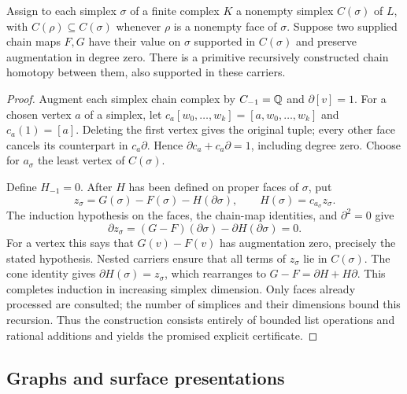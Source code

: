 \begin{theorem}
\label{thm:simplex-carrier}
Assign to each simplex $\sigma$ of a finite complex $K$ a nonempty
simplex $C(\sigma)$ of $L$, with
$C(\rho)\subseteq C(\sigma)$ whenever $\rho$ is a nonempty face of
$\sigma$.  Suppose two supplied chain maps $F,G$ have their value on
$\sigma$ supported in $C(\sigma)$ and preserve augmentation in degree
zero.  There is a primitive recursively constructed chain homotopy
between them, also supported in these carriers.
\end{theorem}
\begin{proof}
Augment each simplex chain complex by $C_{-1}=\mathbb Q$ and
$\partial[v]=1$.  For a chosen vertex $a$ of a simplex, let
$c_a[w_0,\ldots,w_k]=[a,w_0,\ldots,w_k]$ and $c_a(1)=[a]$.
Deleting the first vertex gives the original tuple; every other face
cancels its counterpart in $c_a\partial$.  Hence
$\partial c_a+c_a\partial=1$, including degree zero.  Choose for
$a_\sigma$ the least vertex of $C(\sigma)$.

Define $H_{-1}=0$.  After $H$ has been defined on proper faces of
$\sigma$, put
\[
 z_\sigma=G(\sigma)-F(\sigma)-H(\partial\sigma),\qquad
 H(\sigma)=c_{a_\sigma}z_\sigma.
\]
The induction hypothesis on the faces, the chain-map identities, and
$\partial^2=0$ give
\[
 \partial z_\sigma
   =(G-F)(\partial\sigma)-\partial H(\partial\sigma)=0.
\]
For a vertex this says that $G(v)-F(v)$ has augmentation zero, precisely
the stated hypothesis.  Nested carriers ensure that all terms of
$z_\sigma$ lie in $C(\sigma)$.  The cone identity gives
$\partial H(\sigma)=z_\sigma$, which rearranges to
$G-F=\partial H+H\partial$.  This completes induction in increasing
simplex dimension.  Only faces already processed are consulted; the
number of simplices and their dimensions bound this recursion.  Thus
the construction consists entirely of bounded list operations and
rational additions and yields the promised explicit certificate.
\end{proof}

\subsection{Graphs and surface presentations}

